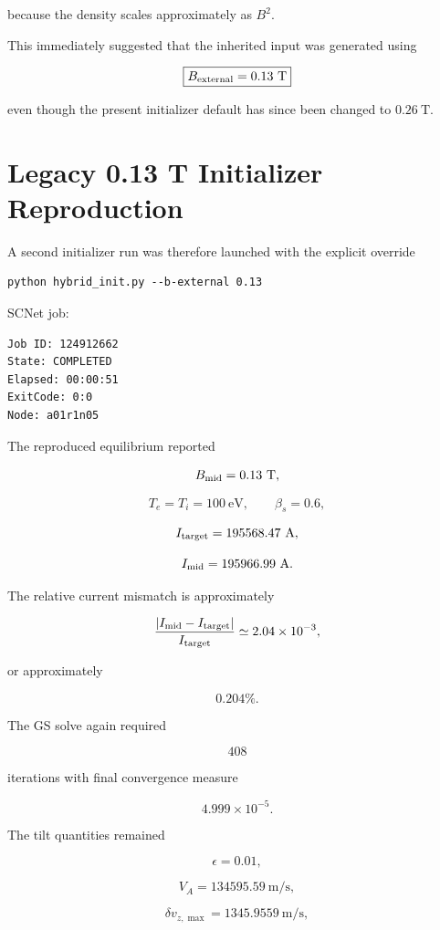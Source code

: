 \documentclass[11pt,a4paper]{article}
\begin{document}
because the density scales approximately as \(B^2\).

This immediately suggested that the inherited input was generated using

\[
\boxed{
B_{\rm external}=0.13~\mathrm{T}
}
\]

even though the present initializer default has since been changed to
\(0.26~\mathrm{T}\).

\section{Legacy 0.13 T Initializer Reproduction}

A second initializer run was therefore launched with the explicit override

\begin{lstlisting}
python hybrid_init.py --b-external 0.13
\end{lstlisting}

SCNet job:

\begin{lstlisting}
Job ID: 124912662
State: COMPLETED
Elapsed: 00:00:51
ExitCode: 0:0
Node: a01r1n05
\end{lstlisting}

The reproduced equilibrium reported

\[
B_{\rm mid}=0.13~\mathrm{T},
\]

\[
T_e=T_i=100~\mathrm{eV},
\qquad
\beta_s=0.6,
\]

\[
I_{\rm target}=195568.47~\mathrm{A},
\]

\[
I_{\rm mid}=195966.99~\mathrm{A}.
\]

The relative current mismatch is approximately

\[
\frac{|I_{\rm mid}-I_{\rm target}|}{I_{\rm target}}
\simeq
2.04\times10^{-3},
\]

or approximately

\[
0.204\%.
\]

The GS solve again required

\[
408
\]

iterations with final convergence measure

\[
4.999\times10^{-5}.
\]

The tilt quantities remained

\[
\epsilon=0.01,
\]

\[
V_A=134595.59~\mathrm{m/s},
\]

\[
\delta v_{z,\max}=1345.9559~\mathrm{m/s},
\]
\end{document}
